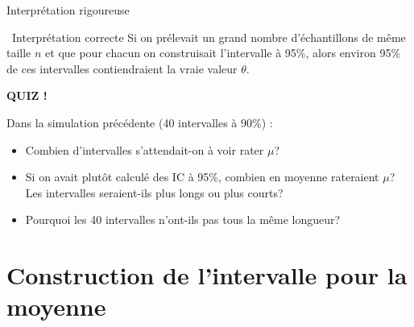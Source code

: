 \documentclass{BeamerTemplate}
\begin{document}
\begin{frame}[t]{Interprétation rigoureuse}
  \begin{Boite}{\faCheckCircle\ Interprétation correcte}
    \small
    Si on prélevait un grand nombre d'échantillons de même taille $n$ et que pour chacun on construisait l'intervalle à 95\%, alors \alert{environ 95\% de ces intervalles contiendraient la vraie valeur $\theta$}.
  \end{Boite}

  \vspace{-3mm}
\end{frame}

\begin{frame}[plain,t]
  \centerline{\LARGE\bfseries\alert{QUIZ !}}

  \medskip
  Dans la simulation précédente (40 intervalles à 90\%) :
  \begin{itemize}\itemsep 1.2cm
    \item Combien d'intervalles s'attendait-on à voir rater $\mu$?
    \item<2-> Si on avait plutôt calculé des IC à 95\%, combien en moyenne rateraient $\mu$? Les intervalles seraient-ils plus longs ou plus courts?
    \item<3-> Pourquoi les 40 intervalles n'ont-ils pas tous la même longueur?
  \end{itemize}
\end{frame}

\section{Construction de l'intervalle pour la moyenne}
\end{document}
